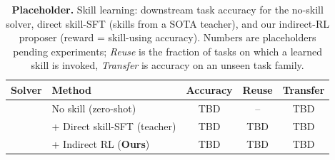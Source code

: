 \begin{table}[t]
\caption{\textbf{Placeholder.} Skill learning: downstream task accuracy for the no-skill solver, direct skill-SFT
(skills from a SOTA teacher), and our indirect-RL proposer (reward = skill-using accuracy). Numbers are
placeholders pending experiments; \emph{Reuse} is the fraction of tasks on which a learned skill is invoked,
\emph{Transfer} is accuracy on an unseen task family.}
\label{tab:skill_main}
\begin{center}
\small
\begin{tabular}{llccc}
\toprule
Solver & Method & Accuracy & Reuse & Transfer \\
\midrule
{}
 & No skill (zero-shot)              & TBD & --  & TBD \\
 & \; + Direct skill-SFT (teacher)   & TBD & TBD & TBD \\
 & \; + Indirect RL (\textbf{Ours})  & TBD & TBD & TBD \\
\bottomrule
\end{tabular}
\end{center}
\end{table}
